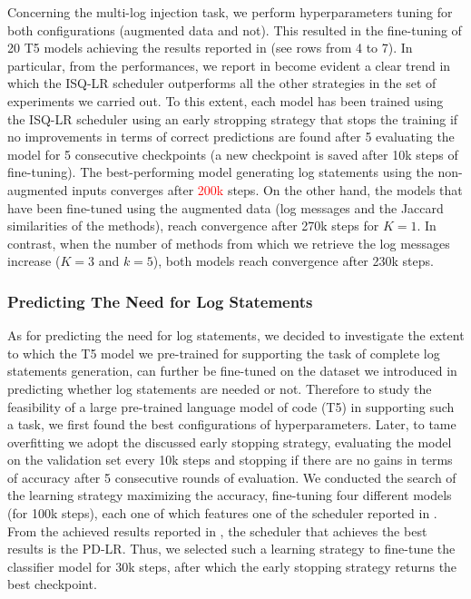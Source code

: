 Concerning the multi-log injection task, we perform hyperparameters tuning for both configurations (\ie augmented data and not). This resulted in the fine-tuning of 20 T5 models achieving the results reported in  (see rows from 4 to 7). In particular, from the performances, we report in  become evident a clear trend in which the ISQ-LR scheduler outperforms all the other strategies in the set of experiments we carried out. To this extent, each model has been trained using the ISQ-LR scheduler using an early stropping strategy that stops the training if no improvements in terms of correct predictions are found after 5 evaluating the model for 5 consecutive checkpoints (a new checkpoint is saved after 10k steps of fine-tuning).
The best-performing model generating log statements using the non-augmented inputs converges after \textcolor{red}{200k} steps.
On the other hand, the models that have been fine-tuned using the augmented data (\ie log messages and the Jaccard similarities of the methods), reach convergence after 270k steps for $K=1$. In contrast, when the number of methods from which we retrieve the log messages increase (\ie $K=3$ and $k=5$), both models reach convergence after 230k steps.

\subsubsection{Predicting The Need for Log Statements}
As for predicting the need for log statements, we decided to investigate the extent to which the T5 model we pre-trained for supporting the task of complete log statements generation, can further be fine-tuned on the dataset we introduced in  predicting whether log statements are needed or not.
Therefore to study the feasibility of a large pre-trained language model of code (\ie T5) in supporting such a task, we first found the best configurations of hyperparameters. Later, to tame overfitting we adopt the discussed early stopping strategy, evaluating the model on the validation set every 10k steps and stopping if there are no gains in terms of accuracy after 5 consecutive rounds of evaluation.
We conducted the search of the learning strategy maximizing the accuracy, fine-tuning four different models (for 100k steps), each one of which features one of the scheduler reported in  . From the achieved results reported in , the scheduler that achieves the best results is the PD-LR. Thus, we selected such a learning strategy to fine-tune the classifier model for 30k steps, after which the early stopping strategy returns the best checkpoint.

